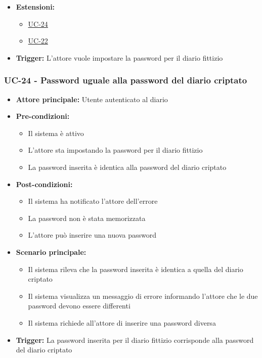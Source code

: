 \documentclass[a4paper,12pt]{article}
\begin{document}
\begin{itemize}
\begin{itemize}
    \end{itemize}
    \item \textbf{Estensioni:}
    \begin{itemize}
        \item \hyperref[subsec:UC-24]{UC-24}
        \item \hyperref[subsec:UC-22]{UC-22}
    \end{itemize}
    \item \textbf{Trigger:} L'attore vuole impostare la password per il diario fittizio
\end{itemize}

\subsubsection{UC-24 - Password uguale alla password del diario criptato} \label{subsec:UC-24}
\begin{itemize}
    \item \textbf{Attore principale:} Utente autenticato al diario
    \item \textbf{Pre-condizioni:}
    \begin{itemize}
        \item Il sistema è attivo
        \item L'attore sta impostando la password per il diario fittizio
        \item La password inserita è identica alla password del diario criptato
    \end{itemize}
    \item \textbf{Post-condizioni:} 
    \begin{itemize}
        \item Il sistema ha notificato l'attore dell'errore
        \item La password non è stata memorizzata
        \item L'attore può inserire una nuova password
    \end{itemize}
    \item \textbf{Scenario principale:} 
    \begin{itemize}
        \item Il sistema rileva che la password inserita è identica a quella del diario criptato
        \item Il sistema visualizza un messaggio di errore informando l'attore che le due password devono essere differenti
        \item Il sistema richiede all'attore di inserire una password diversa
    \end{itemize}
    \item \textbf{Trigger:} La password inserita per il diario fittizio corrisponde alla password del diario criptato
\end{itemize}
\end{document}
